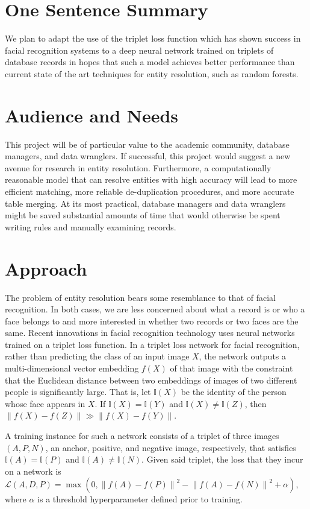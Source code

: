 \documentclass{proc}
\begin{document}
\section{One Sentence Summary}

We plan to adapt the use of the triplet loss function which has shown success in facial recognition systems to a deep neural network trained on triplets of database records in hopes that such a model achieves better performance than current state of the art techniques for entity resolution, such as random forests.

\section{Audience and Needs}

This project will be of particular value to the academic community, database managers, and data wranglers. If successful, this project would suggest a new avenue for research in entity resolution. Furthermore, a computationally reasonable model that can resolve entities with high accuracy will lead to more efficient matching, more reliable de-duplication procedures, and more accurate table merging. At its most practical, database managers and data wranglers might be saved substantial amounts of time that would otherwise be spent writing rules and manually examining records.

\section{Approach}

The problem of entity resolution bears some resemblance to that of facial recognition. In both cases, we are less concerned about what a record is or who a face belongs to and more interested in whether two records or two faces are the same. Recent innovations in facial recognition technology uses neural networks trained on a triplet loss function. In a triplet loss network for facial recognition, rather than predicting the class of an input image $X$, the network outputs a multi-dimensional vector embedding $f(X)$ of that image with the constraint that the Euclidean distance between two embeddings of images of two different people is significantly large. That is, let $\mathbb{I}(X)$ be the identity of the person whose face appears in $X$. If $\mathbb{I}(X) = \mathbb{I}(Y)$ and $\mathbb{I}(X) \neq \mathbb{I}(Z)$, then $\left\|f(X) - f(Z) \right\|  \gg \left\|f(X) - f(Y) \right\|$.

A training instance for such a network consists of a triplet of three images $(A, P, N)$, an anchor, positive, and negative image, respectively, that satisfies $\mathbb{I}(A) = \mathbb{I}(P)$ and $\mathbb{I}(A) \neq \mathbb{I}(N)$. Given said triplet, the loss that they incur on a network is $\mathcal{L}(A, D, P) = \max(0, \left\|f(A) - f(P) \right\|^2 - \left\|f(A) - f(N) \right\|^2 + \alpha)$, where $\alpha$ is a threshold hyperparameter defined prior to training.
\end{document}
